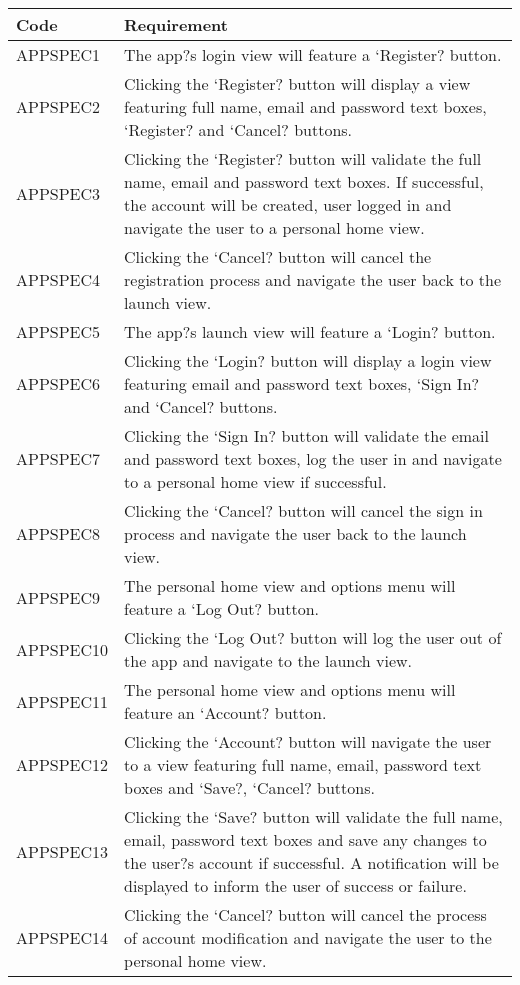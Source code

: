 \documentclass[11pt,a4paper]{article}
\begin{document}
\begin{longtable}{|p{2.5cm}p{13cm}|}
\hline
\textbf{Code} & \textbf{Requirement} \\

\hline
APPSPEC1 & The app?s login view will feature a `Register? button. \\ \hline
APPSPEC2 & Clicking the `Register? button will display a view featuring full name, email and password text boxes, `Register? and `Cancel? buttons. \\ \hline
APPSPEC3 & Clicking the `Register? button will validate the full name, email and password text boxes. If successful, the account will be created, user logged in and navigate the user to a personal home view. \\ \hline
APPSPEC4 & Clicking the `Cancel? button will cancel the registration process and navigate the user back to the launch view. \\ \hline
APPSPEC5 & The app?s launch view will feature a `Login? button. \\ \hline
APPSPEC6 & Clicking the `Login? button will display a login view featuring email and password text boxes, `Sign In? and `Cancel? buttons. \\ \hline
APPSPEC7 & Clicking the `Sign In? button will validate the email and password text boxes, log the user in and navigate to a personal home view if successful. \\ \hline
APPSPEC8 & Clicking the `Cancel? button will cancel the sign in process and navigate the user back to the launch view. \\ \hline
APPSPEC9 & The personal home view and options menu will feature a `Log Out? button. \\ \hline
APPSPEC10 & Clicking the `Log Out? button will log the user out of the app and navigate to the launch view. \\ \hline
APPSPEC11 & The personal home view and options menu will feature an `Account? button. \\ \hline
APPSPEC12 & Clicking the `Account? button will navigate the user to a view featuring full name, email, password text boxes and `Save?, `Cancel? buttons. \\ \hline
APPSPEC13 & Clicking the `Save? button will validate the full name, email, password text boxes and save any changes to the user?s account if successful. A notification will be displayed to inform the user of success or failure. \\ \hline
APPSPEC14 & Clicking the `Cancel? button will cancel the process of account modification and navigate the user to the personal home view. \\ \hline

\end{longtable}
\end{document}
